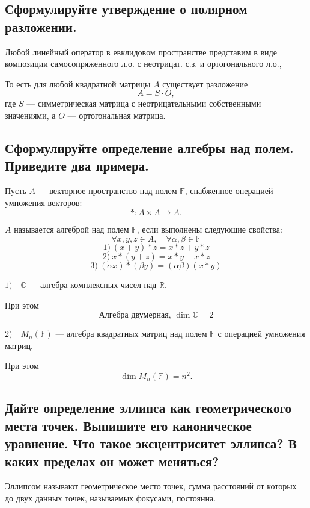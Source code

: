 \subsection{Сформулируйте утверждение о полярном разложении.}

\begin{theorem}
    Любой линейный оператор в евклидовом пространстве представим в виде композиции самосопряженного л.о. с неотрицат. с.з. и ортогонального л.о.,

    То есть для любой квадратной матрицы $A$ существует разложение
    \[
        A = S \cdot O,
    \]
    где $S$ --- симметрическая матрица с неотрицательными собственными значениями, а $O$ --- ортогональная матрица.
\end{theorem}
\subsection{Сформулируйте определение алгебры над полем. Приведите два примера.}

\begin{definition}
    Пусть $A$ --- векторное пространство над полем $\mathbb{F}$, снабженное операцией умножения векторов:
    \[
        *: A \times A \to A.
    \]
    
    $A$ называется алгеброй над полем $\mathbb{F}$, если выполнены следующие свойства:
    \[
        \forall x, y, z \in A,\quad \forall \alpha, \beta \in \mathbb{F}
    \]
    \[
        1)\ (x+y)*z = x*z + y*z
    \]
    \[
        2)\ x*(y+z) = x*y + x*z
    \]
    \[
        3)\ (\alpha x)*(\beta y) = (\alpha\beta)(x*y)
    \]
\end{definition}
\begin{example}
    $1) \quad
        \mathbb{C}
    $
    --- алгебра комплексных чисел над $\mathbb{R}$.
    
    При этом
    \[
        \text{Алгебра двумерная, }\dim\mathbb{C}=2
    \]

    $2) \quad
        M_n(\mathbb{F})
    $
    --- алгебра квадратных матриц над полем $\mathbb{F}$ с операцией умножения матриц.
    
    При этом
    \[
        \dim M_n(\mathbb{F})=n^2.
    \]
\end{example}
\subsection{Дайте определение эллипса как геометрического места точек. Выпишите его каноническое уравнение. Что такое эксцентриситет эллипса? В каких пределах он может меняться?}
\begin{definition}
    Эллипсом называют геометрическое место точек, сумма расстояний от которых до двух данных точек, называемых фокусами, постоянна.
\end{definition}

